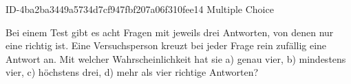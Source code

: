 \begin{exercise}
      {ID-4ba2ba3449a5734d7cf947fbf207a06f310fee14}
      {Multiple Choice}
  \ifproblem\problem\par
    Bei einem Test gibt es acht Fragen mit jeweils drei Antworten, von denen nur
    eine richtig ist. Eine Versuchsperson kreuzt bei jeder Frage rein zufällig
    eine Antwort an. Mit welcher Wahrscheinlichkeit hat sie
    a) genau vier,
    b) mindestens vier,
    c) höchstens drei,
    d) mehr als vier
    richtige Antworten?
  \fi
\end{exercise}
